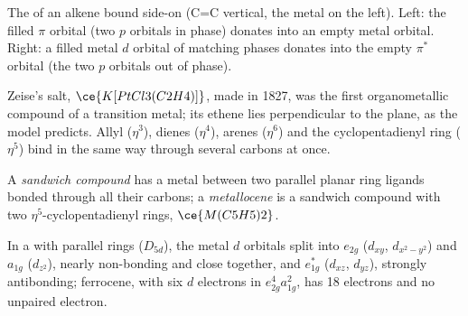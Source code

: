 \begin{omfigure}

{\small The  of an alkene bound side-on (C=C
vertical, the metal on the left). Left: the filled $\pi$ orbital (two $p$ orbitals in
phase) donates into an empty metal orbital. Right: a filled metal $d$ orbital
of matching phases donates into the empty $\pi^*$ orbital (the two $p$ orbitals out of
phase).}
\end{omfigure}

Zeise's salt, $\ce{K[PtCl3(C2H4)]}$, made in 1827, was the first organometallic compound
of a transition metal; its ethene lies perpendicular to the  plane, as
the model predicts. Allyl ($\eta^3$), dienes ($\eta^4$), arenes ($\eta^6$) and the cyclopentadienyl
ring ($\eta^5$) bind in the same way through several carbons at once.

\begin{definition}[Metallocenes]\label{def:b3:organometallic-bonding:metallocene}
A \emph{sandwich compound} has a metal between two
parallel planar ring ligands bonded through all their carbons; a
\emph{metallocene} is a sandwich compound with two $\eta^5$-cyclopentadienyl
rings, $\ce{M(C5H5)2}$.
\end{definition}

\begin{proposition}\label{prop:b3:organometallic-bonding:ferrocene}
In a  with parallel rings ($D_{5d}$), the metal $d$ orbitals split into $e_{2g}$
($d_{xy}$, $d_{x^2-y^2}$) and $a_{1g}$ ($d_{z^2}$), nearly non-bonding and close together, and $e_{1g}^\ast$ ($d_{xz}$,
$d_{yz}$), strongly antibonding; ferrocene, with six $d$ electrons in $e_{2g}^4a_{1g}^2$, has 18
electrons and no unpaired electron.
\end{proposition}

